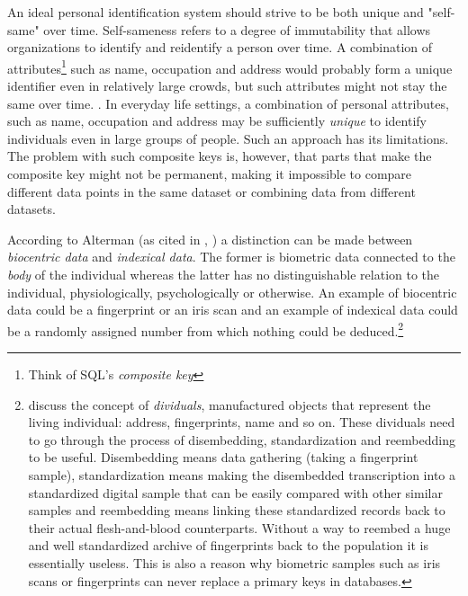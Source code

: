 An ideal personal identification system should strive to be both unique and "self-same" over time. Self-sameness refers to a degree of immutability that allows organizations to identify and reidentify a person over time. A combination of attributes\footnote{Think of SQL's \emph{composite key}} such as name, occupation and address would probably form a unique identifier even in relatively large crowds, but such attributes might not stay the same over time. \citep{brensinger2021}. In everyday life settings, a combination of personal attributes, such as name, occupation and address may be sufficiently \emph{unique} to identify individuals even in large groups of people. Such an approach has its limitations. The problem with such composite keys is, however, that parts that make the composite key might not be permanent, making it impossible to compare different data points in the same dataset or combining data from different datasets.

According to Alterman (as cited in \citeauthor{ajana2013}, \citeyear[8]{ajana2013}) a distinction can be made between \emph{biocentric data} and \emph{indexical data}. The former is biometric data connected to the \emph{body} of the individual whereas the latter has no distinguishable relation to the individual, physiologically, psychologically or otherwise. An example of biocentric data could be a fingerprint or an iris scan and an example of indexical data could be a randomly assigned number from which nothing could be deduced.\footnote{\citet{brensinger2021} discuss the concept of \emph{dividuals}, manufactured objects that represent the living individual: address, fingerprints, name and so on. These dividuals need to go through the process of disembedding, standardization and reembedding to be useful. Disembedding means data gathering (taking a fingerprint sample), standardization means making the disembedded transcription into a standardized digital sample that can be easily compared with other similar samples and reembedding means linking these standardized records back to their actual flesh-and-blood counterparts. Without a way to reembed a huge and well standardized archive of fingerprints back to the population it is essentially useless. This is also a reason why biometric samples such as iris scans or fingerprints can never replace a primary keys in databases.}

